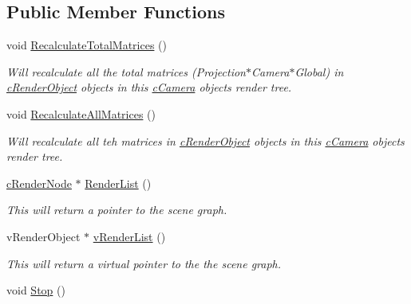 \subsection*{Public Member Functions}
\begin{DoxyCompactItemize}
\item 
\hypertarget{classc_camera_a1dbeb4e752d2a4cb50073a43c8c2132f}{
void \hyperlink{classc_camera_a1dbeb4e752d2a4cb50073a43c8c2132f}{RecalculateTotalMatrices} ()}
\label{classc_camera_a1dbeb4e752d2a4cb50073a43c8c2132f}

\begin{DoxyCompactList}\small\item\em Will recalculate all the total matrices (Projection$\ast$Camera$\ast$Global) in \hyperlink{classc_render_object}{cRenderObject} objects in this \hyperlink{classc_camera}{cCamera} objects render tree. \end{DoxyCompactList}\item 
\hypertarget{classc_camera_a4b27d2d3296c628615dc06b312459d70}{
void \hyperlink{classc_camera_a4b27d2d3296c628615dc06b312459d70}{RecalculateAllMatrices} ()}
\label{classc_camera_a4b27d2d3296c628615dc06b312459d70}

\begin{DoxyCompactList}\small\item\em Will recalculate all teh matrices in \hyperlink{classc_render_object}{cRenderObject} objects in this \hyperlink{classc_camera}{cCamera} objects render tree. \end{DoxyCompactList}\item 
\hypertarget{classc_camera_a9f2dcf74c52d7d3d0f4199b9e0d491c6}{
\hyperlink{classc_render_node}{cRenderNode} $\ast$ \hyperlink{classc_camera_a9f2dcf74c52d7d3d0f4199b9e0d491c6}{RenderList} ()}
\label{classc_camera_a9f2dcf74c52d7d3d0f4199b9e0d491c6}

\begin{DoxyCompactList}\small\item\em This will return a pointer to the scene graph. \end{DoxyCompactList}\item 
\hypertarget{classc_camera_ac63b2c284eee4b9b7182d85390279336}{
vRenderObject $\ast$ \hyperlink{classc_camera_ac63b2c284eee4b9b7182d85390279336}{vRenderList} ()}
\label{classc_camera_ac63b2c284eee4b9b7182d85390279336}

\begin{DoxyCompactList}\small\item\em This will return a virtual pointer to the the scene graph. \end{DoxyCompactList}\item 
\hypertarget{classc_camera_a6701644b2d73e607cee85dbc866ba6d9}{
void \hyperlink{classc_camera_a6701644b2d73e607cee85dbc866ba6d9}{Stop} ()}
\label{classc_camera_a6701644b2d73e607cee85dbc866ba6d9}


\end{DoxyCompactItemize}
